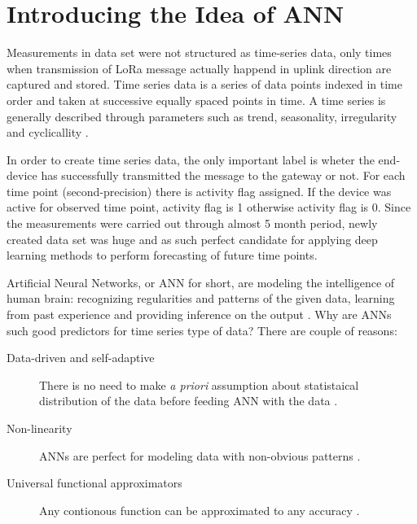 \documentclass[10pt, a4paper]{article} %
\begin{document}
\section{Introducing the Idea of ANN}

Measurements in data set were not structured as time-series data, only times when transmission of LoRa message actually happend in uplink direction are captured and stored. 
Time series data is a series of data points indexed in time order and taken at successive equally spaced points in time. A time series is generally described through parameters such as trend, seasonality, irregularity and cyclicallity \cite{Adhikari_timeseries}.

In order to create time series data, the only important label is wheter the end-device has successfully transmitted the message to the gateway or not. 
For each time point (second-precision) there is activity flag assigned. If the device was active for observed time point, activity flag is 1 otherwise activity flag is 0.
Since the measurements were carried out through almost 5 month period, newly created data set was huge and as such perfect candidate for applying deep learning methods to perform forecasting of future time points.

Artificial Neural Networks, or ANN for short, are modeling the intelligence of human brain: recognizing regularities and patterns of the given data, learning from past experience and providing inference on the output \cite{Adhikari_timeseries}.
Why are ANNs such good predictors for time series type of data? There are couple of reasons:
\begin{description}
	\item[Data-driven and self-adaptive] There is no need to make \emph{a priori} assumption about statistaical distribution of the data before feeding ANN with the data \cite{Adhikari_timeseries}.
	\item [Non-linearity] ANNs are perfect for modeling data with non-obvious patterns \cite{Zhang_ann}.
	\item [Universal functional approximators] Any contionous function can be approximated to any accuracy \cite{Hornik_ann}.
\end{description}
\end{document}
